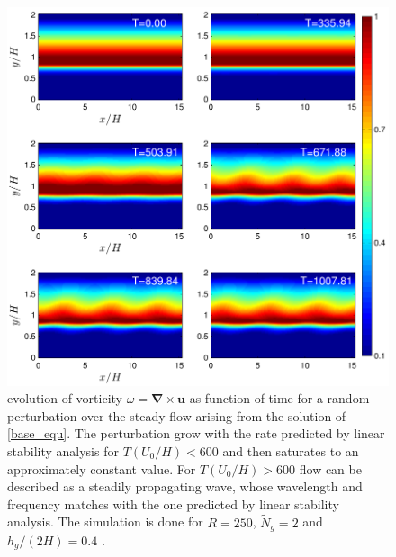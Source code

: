 \documentclass[12pt]{report}   %
\newcommand{\bu}{\mathbf{u}}
\newcommand{\grad}{\mathbf{\nabla}}
\newcommand{\Ndg}{\tilde{N}_g}
\begin{document}
\begin{figure}
 \centerline{\includegraphics[scale=1.3]{VorticityColor}}
 \caption [ evolution of vorticity $\omega = \grad \times \bu$ as function of time for a random perturbation over the steady flow arising from the solution of \eqref{base_equ}. ]{ evolution of vorticity $\omega = \grad \times \bu$ as function of time for a random perturbation over the steady flow arising from the solution of \eqref{base_equ}. The perturbation grow with the rate predicted by linear stability analysis for $T(U_0/H)<600$ and then saturates to an approximately constant value. For $T(U_0/H) >600$ flow can be described as a steadily propagating wave, whose wavelength and frequency matches with the one predicted by linear stability analysis. The simulation is done for $R=250$, $\Ndg=2$ and $h_g/(2H)=0.4$ . } 
\label{VorticityColor}
\end{figure}
\end{document}
